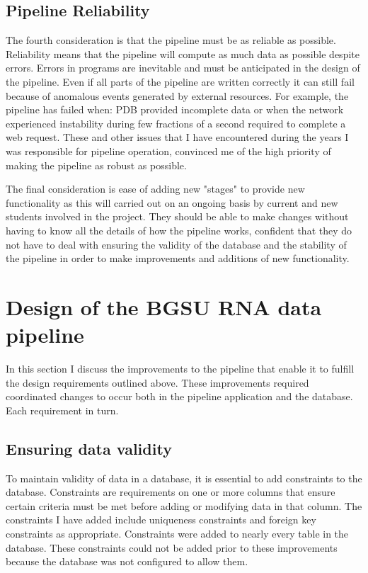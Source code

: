 \subsection{Pipeline Reliability}

The fourth consideration is that the pipeline must be as reliable as possible.
Reliability means that the pipeline will compute as much data as possible
despite errors. Errors in programs are inevitable and must be anticipated in the
design of the pipeline. Even if all parts of the pipeline are written correctly
it can still fail because of anomalous events generated by external resources.
For example, the pipeline has failed when:  PDB provided incomplete data or when
the network experienced instability during few fractions of a second required to
complete a web request. These and other issues that I have encountered during
the years I was responsible for pipeline operation, convinced me of the high
priority of making the pipeline as robust as possible.

The final consideration is ease of adding new "stages" to provide new
functionality as this will carried out on an ongoing basis by current and new
students involved in the project. They should be able to make changes without
having to know all the details of how the pipeline works, confident that they do
not have to deal with ensuring the validity of the database and the stability of
the pipeline in order to make improvements and additions of new functionality.

\section{Design of the BGSU RNA data pipeline }

In this section I discuss the improvements to the pipeline that enable it to
fulfill the design requirements outlined above. These improvements required
coordinated changes to occur both in the pipeline application and the database.
Each requirement in turn.

\subsection{Ensuring data validity}

To maintain validity of data in a database, it is essential to add constraints
to the database. Constraints are requirements on one or more columns that ensure
certain criteria must be met before adding or modifying data in that column. The
constraints I have added include uniqueness constraints and foreign key
constraints as appropriate. Constraints were added to  nearly every table in the
database. These constraints could not be added prior to these improvements
because the database was not configured to allow them.

